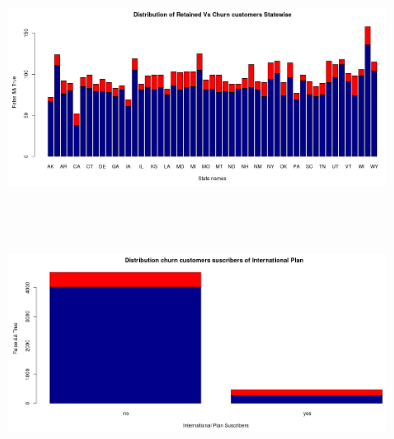 \documentclass{beamer}
\begin{document}
\begin{frame}
	\begin{figure}
		\includegraphics[width=10cm, height=6cm]{ppt_figures/web_dash_2}
	\end{figure}
\end{frame}

\begin{frame}
	\begin{figure}
		\includegraphics[width=10cm, height=6cm]{ppt_figures/web_dash_3}
	\end{figure}
\end{frame}
\end{document}
